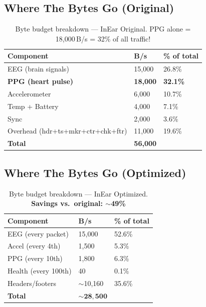 \documentclass[11pt,a4paper]{article}
\begin{document}
\subsection{Where The Bytes Go (Original)}

\begin{table}[H]
\centering
\begin{tabular}{|l|R{2cm}|R{1.5cm}|}
\hline
\textbf{Component} & \textbf{B/s} & \textbf{\% of total} \\\hline
EEG (brain signals) & 15,000 & 26.8\% \\
\textbf{PPG (heart pulse)} & \textbf{18,000} & \textbf{32.1\%} \\
Accelerometer & 6,000 & 10.7\% \\
Temp + Battery & 4,000 & 7.1\% \\
Sync & 2,000 & 3.6\% \\
Overhead (hdr+ts+mkr+ctr+chk+ftr) & 11,000 & 19.6\% \\
\hline
\textbf{Total} & \textbf{56,000} & \\
\hline
\end{tabular}
\caption{Byte budget breakdown --- InEar Original. PPG alone = 18,000\,B/s = 32\% of all traffic!}
\end{table}

\subsection{Where The Bytes Go (Optimized)}

\begin{table}[H]
\centering
\begin{tabular}{|l|R{2cm}|R{1.5cm}|}
\hline
\textbf{Component} & \textbf{B/s} & \textbf{\% of total} \\\hline
EEG (every packet) & 15,000 & 52.6\% \\
Accel (every 4th) & 1,500 & 5.3\% \\
PPG (every 10th) & 1,800 & 6.3\% \\
Health (every 100th) & 40 & 0.1\% \\
Headers/footers & ${\sim}$10,160 & 35.6\% \\
\hline
\textbf{Total} & $\mathbf{{\sim}28{,}500}$ & \\
\hline
\end{tabular}
\caption{Byte budget breakdown --- InEar Optimized. \textbf{Savings vs.\ original: ${\sim}$49\%}}
\end{table}

\end{document}
